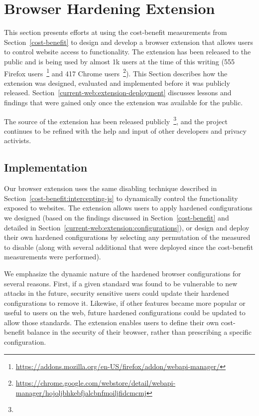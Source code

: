 \section{Browser Hardening Extension}
\label{current-web:extension}

This section presents efforts at using the cost-benefit measurements from
Section~\ref{cost-benefit} to design and develop a browser extension that
allows users to control website access to \WAPI functionality.  The extension
has been released to the public and is being used by almost 1k users at the
time of this writing (555 Firefox
users~\footnote{\url{https://addons.mozilla.org/en-US/firefox/addon/webapi-manager/}}
and 417 Chrome
users~\footnote{\url{https://chrome.google.com/webstore/detail/webapi-manager/hojoljbhkebfjalcbnfmoiljfidcmcmj}}).
This Section describes how the extension was designed, evaluated and
implemented before it was publicly released.
Section~\ref{current-web:extension-deployment} discusses lessons and findings
that were gained only once the extension was available for the public.

The source of the extension has been released publicly~\footnote{\ExtensionSourceUrl},
and the project continues to be refined with the help and input of other
developers and privacy activists.


\subsection{Implementation}
Our browser extension uses the same \WAS disabling technique described in
Section~\ref{cost-benefit:intercepting-js} to dynamically control the \WAPI
functionality exposed to websites.  The extension allows users to
apply hardened configurations we designed (based on the findings
discussed in Section~\ref{cost-benefit} and detailed in
Section~\ref{current-web:extension:configurations}), or design and deploy
their own hardened configurations by selecting any permutation of the
measured \WASs to disable (along with several additional \WAS that were deployed
since the cost-benefit measurements were performed).

We emphasize the dynamic nature of the hardened browser configurations for
several reasons.  First, if a given standard was found to be vulnerable to new
attacks in the future, security sensitive users could update their hardened
configurations to remove it.  Likewise, if other features became more popular
or useful to users on the web, future hardened configurations could be updated
to allow those standards.  The extension enables users to define their own
cost-benefit balance in the security of their browser, rather than prescribing
a specific configuration.

